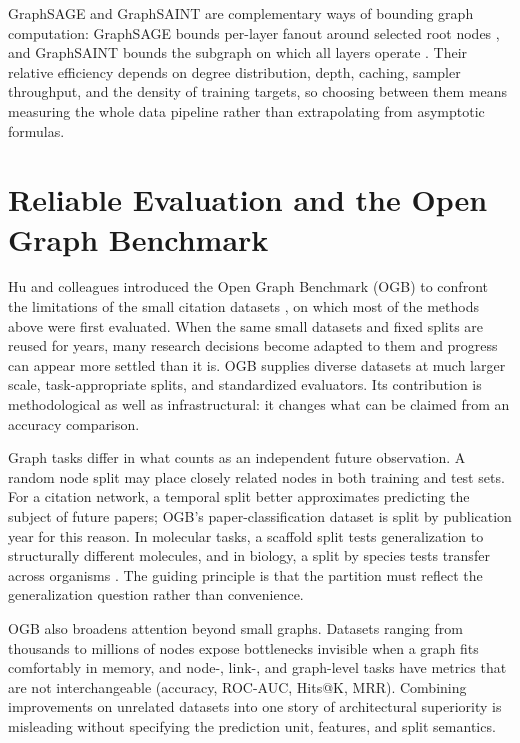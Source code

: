 \documentclass[conference]{IEEEtran}
\begin{document}
GraphSAGE and GraphSAINT are complementary ways of bounding graph computation: GraphSAGE bounds per-layer fanout around selected root nodes \cite{b2}, and GraphSAINT bounds the subgraph on which all layers operate \cite{b8}. Their relative efficiency depends on degree distribution, depth, caching, sampler throughput, and the density of training targets, so choosing between them means measuring the whole data pipeline rather than extrapolating from asymptotic formulas.

\section{Reliable Evaluation and the Open Graph Benchmark}

Hu and colleagues \cite{b9} introduced the Open Graph Benchmark (OGB) to confront the limitations of the small citation datasets \cite{b12}, \cite{b13} on which most of the methods above were first evaluated. When the same small datasets and fixed splits are reused for years, many research decisions become adapted to them and progress can appear more settled than it is. OGB supplies diverse datasets at much larger scale, task-appropriate splits, and standardized evaluators. Its contribution is methodological as well as infrastructural: it changes what can be claimed from an accuracy comparison.

Graph tasks differ in what counts as an independent future observation. A random node split may place closely related nodes in both training and test sets. For a citation network, a temporal split better approximates predicting the subject of future papers; OGB's paper-classification dataset is split by publication year for this reason. In molecular tasks, a scaffold split tests generalization to structurally different molecules, and in biology, a split by species tests transfer across organisms \cite{b9}. The guiding principle is that the partition must reflect the generalization question rather than convenience.

OGB also broadens attention beyond small graphs. Datasets ranging from thousands to millions of nodes expose bottlenecks invisible when a graph fits comfortably in memory, and node-, link-, and graph-level tasks have metrics that are not interchangeable (accuracy, ROC-AUC, Hits@K, MRR). Combining improvements on unrelated datasets into one story of architectural superiority is misleading without specifying the prediction unit, features, and split semantics.
\end{document}
